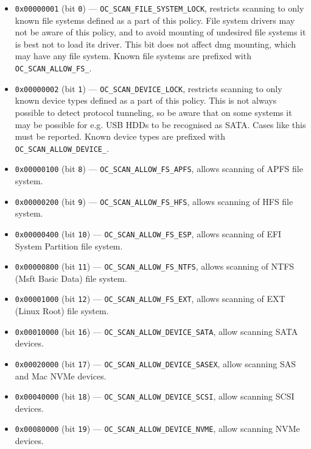 \documentclass[]{article}
\providecommand{\tightlist}{%
  \setlength{\itemsep}{0pt}\setlength{\parskip}{0pt}}
\begin{document}
\begin{enumerate}
  \begin{itemize}
  \tightlist
    \item \texttt{0x00000001} (bit \texttt{0}) --- \texttt{OC\_SCAN\_FILE\_SYSTEM\_LOCK}, restricts
    scanning to only known file systems defined as a part of this policy. File system
    drivers may not be aware of this policy, and to avoid mounting of undesired file
    systems it is best not to load its driver. This bit does not affect dmg mounting,
    which may have any file system. Known file systems are prefixed with
    \texttt{OC\_SCAN\_ALLOW\_FS\_}.
    \item \texttt{0x00000002} (bit \texttt{1}) --- \texttt{OC\_SCAN\_DEVICE\_LOCK}, restricts scanning
    to only known device types defined as a part of this policy. This is not always possible
    to detect protocol tunneling, so be aware that on some systems it may be possible for
    e.g. USB HDDs to be recognised as SATA. Cases like this must be reported. Known device
    types are prefixed with \texttt{OC\_SCAN\_ALLOW\_DEVICE\_}.
    \item \texttt{0x00000100} (bit \texttt{8}) --- \texttt{OC\_SCAN\_ALLOW\_FS\_APFS}, allows scanning
    of APFS file system.
    \item \texttt{0x00000200} (bit \texttt{9}) --- \texttt{OC\_SCAN\_ALLOW\_FS\_HFS}, allows scanning
    of HFS file system.
    \item \texttt{0x00000400} (bit \texttt{10}) --- \texttt{OC\_SCAN\_ALLOW\_FS\_ESP}, allows scanning
    of EFI System Partition file system.
    \item \texttt{0x00000800} (bit \texttt{11}) --- \texttt{OC\_SCAN\_ALLOW\_FS\_NTFS}, allows scanning
    of NTFS (Msft Basic Data) file system.
    \item \texttt{0x00001000} (bit \texttt{12}) --- \texttt{OC\_SCAN\_ALLOW\_FS\_EXT}, allows scanning
    of EXT (Linux Root) file system.
    \item \texttt{0x00010000} (bit \texttt{16}) --- \texttt{OC\_SCAN\_ALLOW\_DEVICE\_SATA}, allow
    scanning SATA devices.
    \item \texttt{0x00020000} (bit \texttt{17}) --- \texttt{OC\_SCAN\_ALLOW\_DEVICE\_SASEX}, allow
    scanning SAS and Mac NVMe devices.
    \item \texttt{0x00040000} (bit \texttt{18}) --- \texttt{OC\_SCAN\_ALLOW\_DEVICE\_SCSI}, allow
    scanning SCSI devices.
    \item \texttt{0x00080000} (bit \texttt{19}) --- \texttt{OC\_SCAN\_ALLOW\_DEVICE\_NVME}, allow
    scanning NVMe devices.

\end{itemize}
\end{enumerate}
\end{document}
